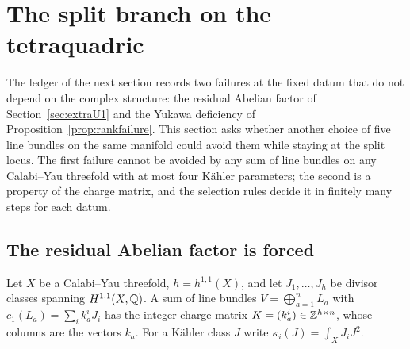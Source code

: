 \section{The split branch on the tetraquadric}\label{sec:splitbranch}
The ledger of the next section records two failures at the fixed datum
that do not depend on the complex structure: the residual Abelian factor
of Section~\ref{sec:extraU1} and the Yukawa deficiency of
Proposition~\ref{prop:rankfailure}. This section asks whether another
choice of five line bundles on the same manifold could avoid them while
staying at the split locus. The first failure cannot be avoided by any
sum of line bundles on any Calabi--Yau threefold with at most four K\"ahler
parameters; the second is a property of the charge matrix, and the
selection rules decide it in finitely many steps for each datum.

\subsection{The residual Abelian factor is forced}\label{sec:forced}
Let $X$ be a Calabi--Yau threefold, $h=h^{1,1}(X)$, and let $J_1,\dots,J_h$
be divisor classes spanning $H^{1,1}(X,\mathbb{Q})$. A sum of line bundles
$V=\bigoplus_{a=1}^nL_a$ with $c_1(L_a)=\sum_ik_a^iJ_i$ has the integer
charge matrix $K=(k_a^i)\in\mathbb{Z}^{h\times n}$, whose columns are the vectors
$k_a$. For a K\"ahler class $J$ write $\kappa_i(J)=\int_XJ_iJ^2$.

